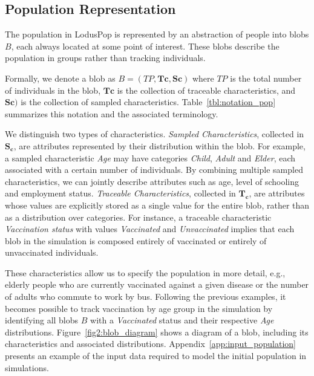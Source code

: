 \documentclass[pdflatex,sn-mathphys-num]{sn-jnl}%
\newcommand\redb[1]{#1}
\theoremstyle{thmstyleone}%
\theoremstyle{thmstyletwo}%
\theoremstyle{thmstylethree}%
\begin{document}
\subsection{Population Representation}
\label{sec:population}
The population in LodusPop is represented by an abstraction of people into blobs $B$, each always located at some point of interest. These blobs describe the population in groups rather than tracking individuals.
\redb{
Formally, we denote a blob as $B = (TP, \bm{Tc}, \bm{Sc})$ where $TP$ is the total number of individuals in the blob, $\bm{Tc}$ is the collection of traceable characteristics, and $\bm{Sc})$ is the collection of sampled characteristics. Table~\ref{tbl:notation_pop} summarizes this notation and the associated terminology.

We distinguish two types of characteristics. \textit{Sampled Characteristics}, collected in $\bm{S_c}$, are attributes represented by their distribution within the blob. For example, a sampled characteristic \textit{Age} may have categories \textit{Child}, \textit{Adult} and \textit{Elder}, each associated with a certain number of individuals. By combining multiple sampled characteristics, we can jointly describe attributes such as age, level of schooling and employment status.
\textit{Traceable Characteristics}, collected in $\bm{T_c}$, are attributes whose values are explicitly stored as a single value for the entire blob, rather than as a distribution over categories. For instance, a traceable characteristic \textit{Vaccination status} with values \textit{Vaccinated} and \textit{Unvaccinated} implies that each blob in the simulation is composed entirely of vaccinated or entirely of unvaccinated individuals.
}

These characteristics allow us to specify the population in more detail, e.g., elderly people who are currently vaccinated against a given disease or the number of adults who commute to work by bus. Following the previous examples, it becomes possible to track vaccination by age group in the simulation by identifying all blobs $B$ with a \textit{Vaccinated} status and their respective \textit{Age} distributions. Figure~\ref{fig2:blob_diagram} shows a diagram of a blob, including its characteristics and associated distributions. Appendix~\ref{app:input_population} presents an example of the input data required to model the initial population in simulations.
\end{document}
